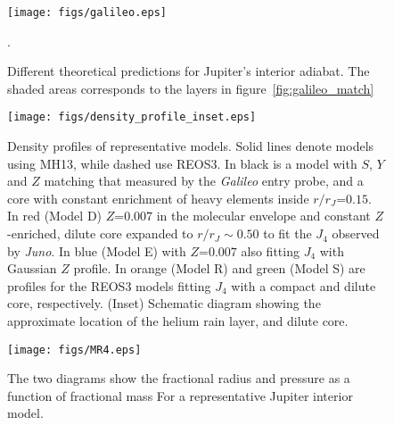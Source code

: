 \begin{figure}[h]
  \begin{center}
    \noindent\texttt{[image: figs/galileo.eps]}
  \end{center}
  \caption{Different theoretical predictions for Jupiter's interior adiabat. The shaded areas corresponds to the layers
    in figure~\ref{fig:galileo_match}}. 
  \label{fig:jup}
\end{figure}


\begin{figure}[h]
\centering

\texttt{[image: figs/density\_profile\_inset.eps]}

\caption{Density profiles of representative models. Solid lines denote models
    using MH13, while dashed use REOS3. In black is a model with $S$, $Y$ and $Z$
    matching that measured by the \textit{Galileo} entry probe, and a core with constant
    enrichment of heavy elements inside $r/r_J$=$0.15$.  In red (Model
    D) $Z$=$0.007$ in the molecular envelope and constant $Z$-enriched, dilute
    core expanded to $r/r_J\sim0.50$ to fit the $J_4$ observed by
    \textit{Juno}. In blue (Model E) with $Z$=$0.007$ also fitting $J_4$ with
    Gaussian $Z$ profile. In orange (Model R) and green (Model S) are profiles
    for the REOS3 models fitting $J_4$ with a compact and dilute core,
    respectively. (Inset) Schematic diagram showing the approximate location of
the helium rain layer, and dilute core.}
\label{fig:density}
\end{figure}

\begin{figure}[h]
  \begin{center}
      \noindent\texttt{[image: figs/MR4.eps]}
  \end{center}
  \caption{The two diagrams show the
    fractional radius and pressure as a function of fractional mass
    For a representative Jupiter interior model.}
\label{fig:our_Jupiter_model}
\end{figure}

